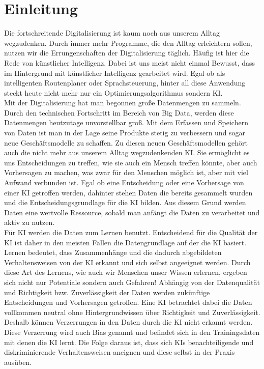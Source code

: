 \chapter{Einleitung}
    \begin{onehalfspace}    
        \label{sec:einleitung}
        Die fortschreitende Digitalisierung ist kaum noch aus unserem Alltag wegzudenken. Durch immer mehr Programme, die den Alltag erleichtern sollen, nutzen wir die Errungenschaften der Digitalisierung täglich. Häufig ist hier die Rede von künstlicher Intelligenz. Dabei ist uns meist nicht einmal Bewusst, dass im Hintergrund mit künstlicher Intelligenz gearbeitet wird. Egal ob als intelligenten Routenplaner oder Sprachsteuerung, hinter all diese Anwendung steckt heute nicht mehr nur ein Optimierungsalgorithmus sondern \ac{KI}. 
        \\
        Mit der Digitalisierung hat man begonnen große Datenmengen zu sammeln. Durch den technischen Fortschritt im Bereich von Big Data, werden diese Datenmengen heutzutage unvorstellbar groß. Mit dem Erfassen und Speichern von Daten ist man in der Lage seine Produkte stetig zu verbessern und sogar neue Geschäftsmodelle zu schaffen. Zu diesen neuen Geschäftsmodellen gehört auch die nicht mehr aus unserem Alltag wegzudenkenden \ac{KI}. Sie ermöglicht es uns Entscheidungen zu treffen, wie sie auch ein Mensch treffen könnte, aber auch Vorhersagen zu machen, was zwar für den Menschen möglich ist, aber mit viel Aufwand verbunden ist. Egal ob eine Entscheidung oder eine Vorhersage von einer \ac{KI} getroffen werden, dahinter stehen Daten die bereits gesammelt wurden und die Entscheidungsgrundlage für die \ac*{KI} bilden. Aus diesem Grund werden Daten eine wertvolle Ressource, sobald man anfängt die Daten zu verarbeitet und aktiv zu nutzen. 
        \\
        Für \ac*{KI} werden die Daten zum Lernen benutzt. Entscheidend für die Qualität der \ac*{KI} ist daher in den meisten Fällen die Datengrundlage auf der die \ac*{KI} basiert. Lernen bedeutet, dass Zusammenhänge und die dadurch abgebildeten Verhaltensweisen von der \ac*{KI} erkannt und sich selbst angeeignet werden. Durch diese Art des Lernens, wie auch wir Menschen unser Wissen erlernen, ergeben sich nicht nur Potentiale sondern auch Gefahren! Abhängig von der Datenqualität und Richtigkeit bzw. Zuverlässigkeit der Daten werden zukünftige Entscheidungen und Vorhersagen getroffen. Eine \ac*{KI} betrachtet dabei die Daten vollkommen neutral ohne Hintergrundwissen über Richtigkeit und Zuverlässigkeit. Deshalb können Verzerrungen in den Daten durch die \ac*{KI} nicht erkannt werden. Diese Verzerrung wird auch Bias genannt und befindet sich in den Trainingsdaten mit denen die \ac*{KI} lernt. Die Folge daraus ist, dass sich \ac*{KI}s benachteiligende und diskriminierende Verhaltensweisen aneignen und diese selbst in der Praxis ausüben.

\end{onehalfspace}

